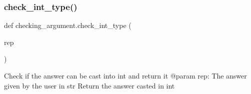\subsubsection{\texorpdfstring{check\+\_\+int\+\_\+type()}{check\_int\_type()}}
{\footnotesize\ttfamily def checking\+\_\+argument.\+check\+\_\+int\+\_\+type (\begin{DoxyParamCaption}\item[{}]{rep }\end{DoxyParamCaption})}

\begin{DoxyVerb}Check if the answer can be cast into int
and return it
    @param rep: The answer given by the user in str
    Return the answer casted in int
\end{DoxyVerb}
 